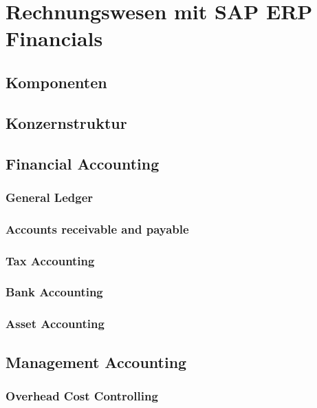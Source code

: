 
\section{Rechnungswesen mit SAP ERP Financials}
\subsection{Komponenten}
\subsection{Konzernstruktur}
\subsection{Financial Accounting} %
\subsubsection{General Ledger} %
\subsubsection{Accounts receivable and payable} %
\subsubsection{Tax Accounting} %


\subsubsection{Bank Accounting} %
\subsubsection{Asset Accounting} %

\subsection{Management Accounting} %
\subsubsection{Overhead Cost Controlling}

